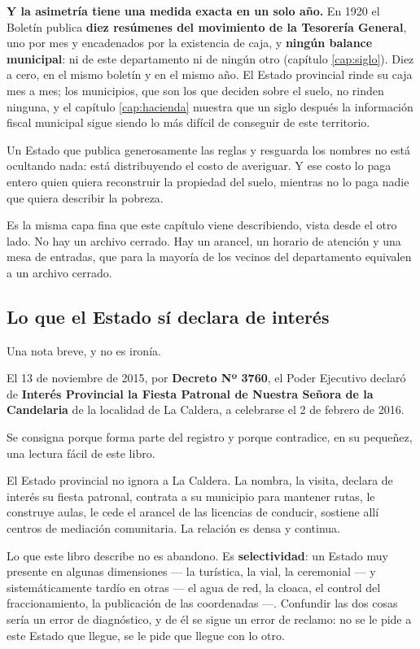 \textbf{Y la asimetría tiene una medida exacta en un solo año.} En 1920 el Boletín publica \textbf{diez resúmenes del movimiento de la Tesorería General}, uno por mes y encadenados por la existencia de caja, y \textbf{ningún balance municipal}: ni de este departamento ni de ningún otro (capítulo \ref{cap:siglo}). Diez a cero, en el mismo boletín y en el mismo año. El Estado provincial rinde su caja mes a mes; los municipios, que son los que deciden sobre el suelo, no rinden ninguna, y el capítulo \ref{cap:hacienda} muestra que un siglo después la información fiscal municipal sigue siendo lo más difícil de conseguir de este territorio.

Un Estado que publica generosamente las reglas y resguarda los nombres no está ocultando nada: está distribuyendo el costo de averiguar. Y ese costo lo paga entero quien quiera reconstruir la propiedad del suelo, mientras no lo paga nadie que quiera describir la pobreza.

Es la misma capa fina que este capítulo viene describiendo, vista desde el otro lado. No hay un archivo cerrado. Hay un arancel, un horario de atención y una mesa de entradas, que para la mayoría de los vecinos del departamento equivalen a un archivo cerrado.

\subsection*{Lo que el Estado sí declara de interés}

Una nota breve, y no es ironía.

El 13 de noviembre de 2015, por \textbf{Decreto Nº 3760}, el Poder Ejecutivo declaró de \textbf{Interés Provincial la Fiesta Patronal de Nuestra Señora de la Candelaria} de la localidad de La Caldera, a celebrarse el 2 de febrero de 2016.

Se consigna porque forma parte del registro y porque contradice, en su pequeñez, una lectura fácil de este libro.

El Estado provincial no ignora a La Caldera. La nombra, la visita, declara de interés su fiesta patronal, contrata a su municipio para mantener rutas, le construye aulas, le cede el arancel de las licencias de conducir, sostiene allí centros de mediación comunitaria. La relación es densa y continua.

Lo que este libro describe no es abandono. Es \textbf{selectividad}: un Estado muy presente en algunas dimensiones --- la turística, la vial, la ceremonial --- y sistemáticamente tardío en otras --- el agua de red, la cloaca, el control del fraccionamiento, la publicación de las coordenadas ---. Confundir las dos cosas sería un error de diagnóstico, y de él se sigue un error de reclamo: no se le pide a este Estado que llegue, se le pide que llegue con lo otro.

